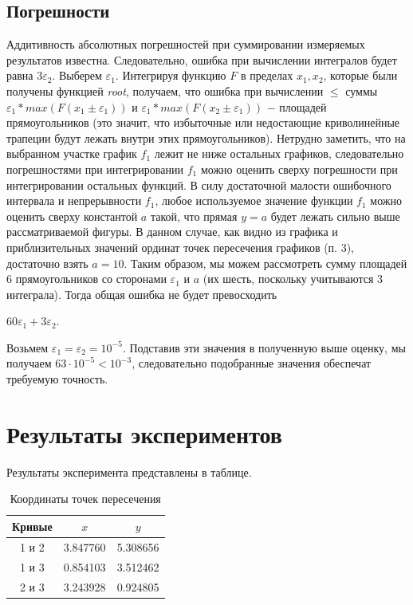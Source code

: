 \documentclass[a4paper,12pt,titlepage,finall]{article}
\begin{document}
\subsection{Погрешности}
Аддитивность абсолютных погрешностей при суммировании измеряемых результатов известна. Следовательно, ошибка при вычислении интегралов будет равна $3\varepsilon_2$. Выберем $\varepsilon_1$. Интегрируя функцию $F$ в пределах $x_1, x_2$, которые были получены функцией \textit{root}, получаем, что ошибка при вычислении $\leq$ суммы $\varepsilon_1 * max(F(x_1 \pm \varepsilon_1))$ и $\varepsilon_1 * max(F(x_2 \pm \varepsilon_1))$ $-$ площадей прямоугольников (это значит, что избыточные или недостающие криволинейные трапеции будут лежать внутри этих прямоугольников). Нетрудно заметить, что на выбранном участке график $f_1$ лежит не ниже остальных графиков, следовательно погрешностями при интегрировании $f_1$ можно оценить сверху погрешности при интегрировании остальных функций. В силу достаточной малости ошибочного интервала и непрерывности $f_1$, любое используемое значение функции $f_1$ можно оценить сверху константой $a$ такой, что прямая $y = a$ будет лежать сильно выше рассматриваемой фигуры. В данном случае, как видно из графика и приблизительных значений ординат точек пересечения графиков (п. 3), достаточно взять $a = 10$. Таким образом, мы можем рассмотреть сумму площадей 6 прямоугольников со сторонами $\varepsilon_1$ и $a$ (их шесть, поскольку учитываются 3 интеграла). Тогда общая ошибка не будет превосходить
\begin{center}
    $60\varepsilon_1 + 3\varepsilon_2$.
\end{center}
Возьмем $\varepsilon_1 = \varepsilon_2 = 10^{-5}$.
Подставив эти значения в полученную выше оценку, мы получаем $63 \cdot 10^{-5} < 10^{-3}$, следовательно подобранные значения обеспечат требуемую точность.
\newpage

\section{Результаты экспериментов}

Результаты эксперимента представлены в таблице. 

\begin{table}[h]
\centering
\begin{tabular}{|c|c|c|}
\hline
Кривые & $x$ & $y$ \\
\hline
1 и 2 &  3.847760 & 5.308656 \\
1 и 3 &  0.854103 & 3.512462 \\
2 и 3 &  3.243928 & 0.924805 \\
\hline
\end{tabular}
\caption{Координаты точек пересечения}
\label{table1}
\end{table}
\end{document}
